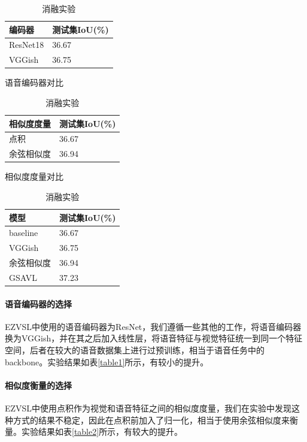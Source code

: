 \documentclass[12pt]{article}
\begin{document}
\begin{table}[H]
  \begin{minipage}[t]{0.3\linewidth}
    \centering
    \begin{tabular}{|l|l|}
  \hline
      编码器 &  测试集IoU(\%) \\ \hline
      ResNet18 &  36.67 \\ \hline
      VGGish &  36.75 \\ \hline
  \end{tabular}
  \caption{语音编码器对比}
  \label{table1}
  \end{minipage}%
  \begin{minipage}[t]{0.3\linewidth}
    \centering
    \begin{tabular}{|l|l|}
    \hline
        相似度度量 &  测试集IoU(\%) \\ \hline
        点积 &  36.67 \\ \hline
        余弦相似度&36.94\\\hline
    \end{tabular}
    \caption{相似度度量对比}
    \label{table2}
  \end{minipage}
  \begin{minipage}[t]{0.3\linewidth}
    \centering
    \begin{tabular}{|l|l|}
    \hline
        模型 &  测试集IoU(\%) \\ \hline
        baseline &  36.67 \\ \hline
        VGGish&36.75\\\hline
        余弦相似度&36.94\\\hline
        GSAVL&37.23\\\hline
    \end{tabular}
    \caption{消融实验}
    \label{table3}
  \end{minipage}
\end{table}
\paragraph{语音编码器的选择}
EZVSL中使用的语音编码器为ResNet，我们遵循一些其他的工作，将语音编码器换为VGGish，并在其之后加入线性层，将语音特征与视觉特征统一到同一个特征空间，后者在较大的语音数据集上进行过预训练，相当于语音任务中的backbone。实验结果如表\ref{table1}所示，有较小的提升。
\paragraph{相似度衡量的选择}
EZVSL中使用点积作为视觉和语音特征之间的相似度度量，我们在实验中发现这种方式的结果不稳定，因此在点积前加入了归一化，相当于使用余弦相似度来衡量。实验结果如表\ref{table2}所示，有较大的提升。
\end{document}
